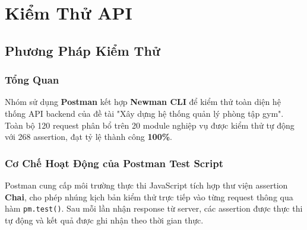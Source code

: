 


\section{Kiểm Thử API}

\subsection{Phương Pháp Kiểm Thử}

\subsubsection{Tổng Quan}

Nhóm sử dụng \textbf{Postman} kết hợp \textbf{Newman CLI} để kiểm thử toàn diện hệ thống API backend của đề tài "Xây dựng hệ thống quản lý phòng tập gym". Toàn bộ 120 request phân bổ trên 20 module nghiệp vụ được kiểm thử tự động với 268 assertion, đạt tỷ lệ thành công \textbf{100\%}.

\subsubsection{Cơ Chế Hoạt Động của Postman Test Script}

Postman cung cấp môi trường thực thi JavaScript tích hợp thư viện assertion \textbf{Chai}, cho phép nhúng kịch bản kiểm thử trực tiếp vào từng request thông qua hàm \texttt{pm.test()}. Sau mỗi lần nhận response từ server, các assertion được thực thi tự động và kết quả được ghi nhận theo thời gian thực.

